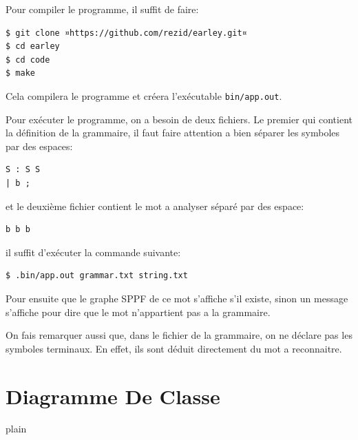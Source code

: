 \documentclass[10pt]{report}
\begin{document}
Pour compiler le programme, il suffit de faire:
\begin{lstlisting}
$ git clone ¤https://github.com/rezid/earley.git¤
$ cd earley
$ cd code
$ make
\end{lstlisting}

Cela compilera le programme et créera l'exécutable \lstinline|bin/app.out|.

Pour exécuter le programme, on a besoin de deux fichiers. Le premier qui contient la définition de la grammaire, il faut faire attention a bien séparer les symboles par des espaces:
\begin{lstlisting}
S : S S
| b ;
\end{lstlisting}
et le deuxième fichier contient le mot a analyser séparé par des espace:
\begin{lstlisting}
b b b
\end{lstlisting}

il suffit d'exécuter la commande suivante:
\begin{lstlisting}
$ .bin/app.out grammar.txt string.txt
\end{lstlisting}

Pour ensuite que le graphe SPPF de ce mot s'affiche s'il existe, sinon un message s'affiche pour dire que le mot n'appartient pas a la grammaire.

On fais remarquer aussi que, dans le fichier de la grammaire, on ne déclare pas les symboles terminaux. En effet, ils sont déduit directement du mot a reconnaitre.

\section{Diagramme De Classe}
 {plain}
  
\end{document}
